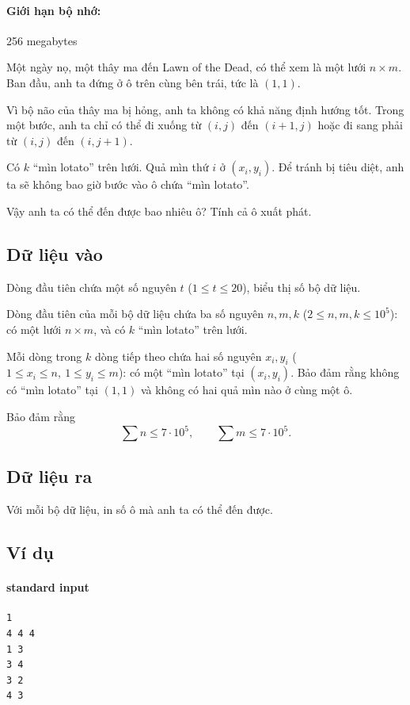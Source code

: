 \documentclass[11pt]{article}
\begin{document}
\paragraph{Giới hạn bộ nhớ:} 256 megabytes

Một ngày nọ, một thây ma đến Lawn of the Dead, có thể xem là một lưới
\(n\times m\). Ban đầu, anh ta đứng ở ô trên cùng bên trái, tức là \((1,1)\).

Vì bộ não của thây ma bị hỏng, anh ta không có khả năng định hướng tốt. Trong
một bước, anh ta chỉ có thể đi xuống từ \((i,j)\) đến \((i+1,j)\) hoặc đi
sang phải từ \((i,j)\) đến \((i,j+1)\).

Có \(k\) ``mìn lotato'' trên lưới. Quả mìn thứ \(i\) ở \((x_i,y_i)\). Để
tránh bị tiêu diệt, anh ta sẽ không bao giờ bước vào ô chứa ``mìn lotato''.

Vậy anh ta có thể đến được bao nhiêu ô? Tính cả ô xuất phát.

\subsection*{Dữ liệu vào}

Dòng đầu tiên chứa một số nguyên \(t\) (\(1\le t\le 20\)), biểu thị số bộ dữ
liệu.

Dòng đầu tiên của mỗi bộ dữ liệu chứa ba số nguyên \(n,m,k\)
(\(2\le n,m,k\le 10^5\)): có một lưới \(n\times m\), và có \(k\) ``mìn
lotato'' trên lưới.

Mỗi dòng trong \(k\) dòng tiếp theo chứa hai số nguyên \(x_i,y_i\)
(\(1\le x_i\le n,\ 1\le y_i\le m\)): có một ``mìn lotato'' tại \((x_i,y_i)\).
Bảo đảm rằng không có ``mìn lotato'' tại \((1,1)\) và không có hai quả mìn
nào ở cùng một ô.

Bảo đảm rằng
\[
  \sum n\le 7\cdot 10^5,\qquad
  \sum m\le 7\cdot 10^5.
\]

\subsection*{Dữ liệu ra}

Với mỗi bộ dữ liệu, in số ô mà anh ta có thể đến được.

\subsection*{Ví dụ}

\paragraph{standard input}
\begin{verbatim}
1
4 4 4
1 3
3 4
3 2
4 3
\end{verbatim}
\end{document}

